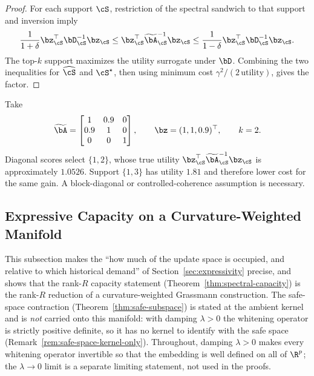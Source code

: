\begin{proof}
For each support $\cS$, restriction of the spectral sandwich to that support
and inversion imply
\begin{equation}
\frac{1}{1+\delta}\bz_{\cS}^\top\bD_{\cS}^{-1}\bz_{\cS}
\leq
\bz_{\cS}^\top\widetilde{\bA}_{\cS}^{-1}\bz_{\cS}
\leq
\frac{1}{1-\delta}\bz_{\cS}^\top\bD_{\cS}^{-1}\bz_{\cS}.
\end{equation}
The top-$k$ support maximizes the utility surrogate under $\bD$. Combining the
two inequalities for $\widehat{\cS}$ and $\cS^\star$, then using minimum cost
$\gamma^2/(2\,\text{utility})$, gives the factor.
\end{proof}

\begin{remark}
Take
\begin{equation}
\widetilde{\bA}=\begin{bmatrix}1&0.9&0\\0.9&1&0\\0&0&1\end{bmatrix},
\qquad \bz=(1,1,0.9)^\top,\qquad k=2.
\end{equation}
Diagonal scores select $\{1,2\}$, whose true utility
$\bz_{\cS}^\top\widetilde{\bA}_{\cS}^{-1}\bz_{\cS}$ is approximately $1.0526$.
Support $\{1,3\}$ has utility $1.81$ and therefore lower cost for the same
gain. A block-diagonal or controlled-coherence assumption is necessary.
\end{remark}

\subsection{Expressive Capacity on a Curvature-Weighted Manifold}
\label{app:expressivity}

This subsection makes the ``how much of the update space is occupied, and
relative to which historical demand'' of Section~\ref{sec:expressivity}
precise, and shows that the rank-$R$ capacity statement
(Theorem~\ref{thm:spectral-capacity}) is the rank-$R$ reduction of a
curvature-weighted Grassmann construction. The safe-space contraction
(Theorem~\ref{thm:safe-subspace}) is stated at the ambient kernel and is
\emph{not} carried onto this manifold: with damping $\lambda>0$ the whitening
operator is strictly positive definite, so it has no kernel to identify with the
safe space (Remark~\ref{rem:safe-space-kernel-only}). Throughout, damping
$\lambda>0$ makes every whitening operator invertible so that the embedding is
well defined on all of $\R^p$; the $\lambda\to0$ limit is a separate limiting
statement, not used in the proofs.


